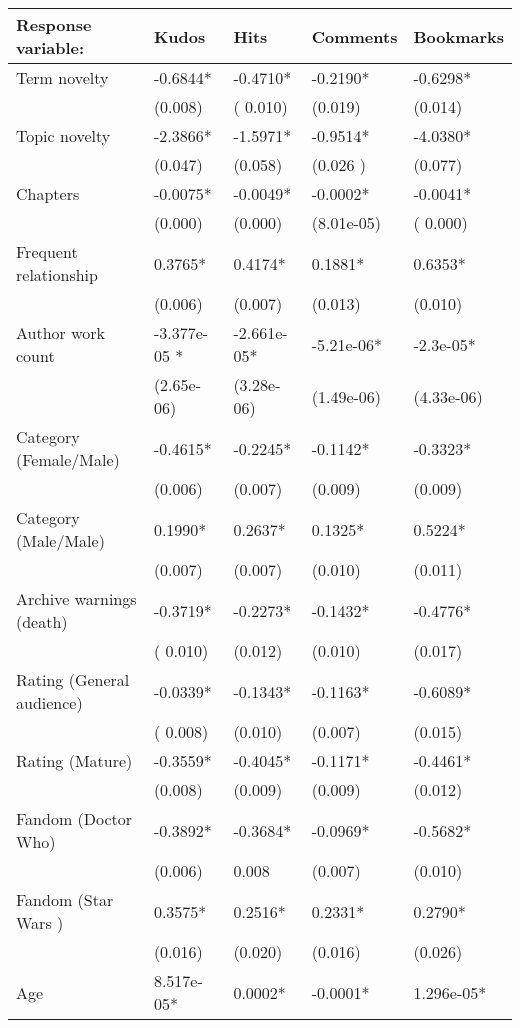 \documentclass[letterpaper]{article} %
\begin{document}
 \begin{table*}
\centering
\begin{tabular}[width=0.8\textwidth]{p{4cm}p{3cm}p{3cm}p{3cm}p{3cm}}
\toprule
Response variable: & Kudos & Hits & Comments & Bookmarks \\ 
   \hline			
Term novelty & -0.6844*&  -0.4710*  & -0.2190* & -0.6298* \\
& (0.008) & ( 0.010) & (0.019) & (0.014)\\
Topic novelty & -2.3866* & -1.5971* & -0.9514* & -4.0380* \\
& (0.047) & (0.058) &  (0.026 ) & (0.077)\\
Chapters & -0.0075*& -0.0049* & -0.0002*& -0.0041* \\
& (0.000) & (0.000) & (8.01e-05) & ( 0.000) \\
Frequent relationship & 0.3765* & 0.4174* & 0.1881* & 0.6353*\\
& (0.006) & (0.007) & (0.013) & (0.010)\\
Author work count & -3.377e-05 * &-2.661e-05* & -5.21e-06* & -2.3e-05*\\
& (2.65e-06) & (3.28e-06) & (1.49e-06) & (4.33e-06)\\
Category (Female/Male) & -0.4615* & -0.2245* & -0.1142* & -0.3323*\\
& (0.006) & (0.007) & (0.009) & (0.009)\\
Category (Male/Male) & 0.1990* & 0.2637* & 0.1325* & 0.5224*\\
& (0.007) & (0.007) & (0.010) & (0.011)\\
Archive warnings (death) & -0.3719* & -0.2273* & -0.1432* & -0.4776*\\
& ( 0.010) & (0.012) & (0.010) & (0.017)\\
Rating (General audience) & -0.0339* & -0.1343* & -0.1163* & -0.6089*\\
& ( 0.008) & (0.010) & (0.007) & (0.015)\\
Rating (Mature) & -0.3559* & -0.4045* & -0.1171* & -0.4461*\\
& (0.008) & (0.009) & (0.009) & (0.012)\\
Fandom (Doctor Who) & -0.3892* & -0.3684* & -0.0969* & -0.5682*\\
& (0.006) & 0.008 & (0.007) & (0.010)\\
Fandom (Star Wars ) & 0.3575* & 0.2516* & 0.2331* & 0.2790*\\
& (0.016) & (0.020) & (0.016) & (0.026)\\
Age & 8.517e-05*& 0.0002* & -0.0001*& 1.296e-05*\\

\end{tabular}
\end{table*}
\end{document}
